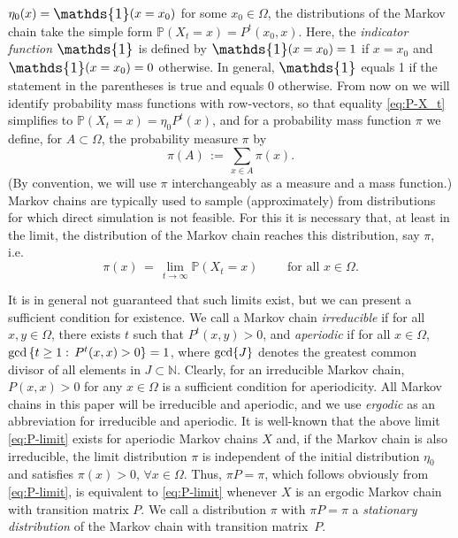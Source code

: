 \documentclass{dis}
\theoremstyle{citing}
\begin{document}
$\eta_0(x)={\scalebox{1.2}{\raisebox{-0.2mm}{$\mathds{1}$}}}(x=x_0)$ for some $x_0\in{\Omega}$, the distributions 
of the Markov chain take the simple form 
${\mathbb{P}}(X_t=x) = P^t(x_0,x)$.
Here, the 
\emph{indicator function} 
${\scalebox{1.2}{\raisebox{-0.2mm}{$\mathds{1}$}}}$ is defined 
by ${\scalebox{1.2}{\raisebox{-0.2mm}{$\mathds{1}$}}}(x=x_0)=1$ if $x=x_0$ and ${\scalebox{1.2}{\raisebox{-0.2mm}{$\mathds{1}$}}}(x=x_0)=0$ otherwise. 
In general, ${\scalebox{1.2}{\raisebox{-0.2mm}{$\mathds{1}$}}}$ equals 1 if the statement in the parentheses is true 
and equals 0 otherwise.
From now on we will identify probability mass functions with 
row-vectors, so that equality \eqref{eq:P-X_t} simplifies to 
${\mathbb{P}}(X_t=x) = \eta_0 P^t(x)$, and 
for a probability mass function $\pi$ we define, for $A\subset{\Omega}$, 
the probability measure $\pi$ by
\[
\pi(A) \,:=\, \sum_{x\in A} \pi(x).
\]
(By convention, we will use $\pi$ interchangeably as a measure and a 
mass function.) \\
Markov chains are typically used to sample 
(approximately) from distributions for which direct simulation 
is not feasible. For this it is necessary that, at least in the 
limit, the distribution of the Markov chain reaches this 
distribution, say $\pi$, i.e.
\vspace{1mm}
\begin{equation} \label{eq:P-limit}
\pi(x)\,=\,\lim_{t\to\infty} {\mathbb{P}}(X_t=x)\qquad \text{ for all } x\in{\Omega}.
\end{equation}

\noindent It is in general not guaranteed that such limits exist, but we 
can present a sufficient condition for 
existence. 
We call a Markov chain 
\emph{irreducible} 
if for 
all $x,y\in{\Omega}$, there exists $t$ such that $P^t(x,y)>0$, and 
\emph{aperiodic} 
if 
for all $x\in{\Omega}$, ${\rm gcd}\left\{t\ge1:\,P^t(x,x)>0\right\}=1$, 
where ${\rm gcd}\{J\}$ denotes the greatest common divisor of all 
elements in $J\subset{\ensuremath{\mathbb{N}}}$. 
Clearly, for an irreducible Markov chain, $P(x,x)>0$ for any 
$x\in{\Omega}$ is a sufficient condition for aperiodicity.
All Markov chains in this paper will be irreducible and aperiodic, 
and we use \emph{ergodic} 
as an abbreviation for irreducible and aperiodic. 
It is well-known that the above limit \eqref{eq:P-limit} exists for 
aperiodic Markov chains $X$ and, 
if the Markov chain is also irreducible, 
the limit distribution $\pi$ is independent of the initial 
distribution $\eta_0$ and satisfies $\pi(x)>0$, $\forall x\in{\Omega}$.
Thus, $\pi P=\pi$, which follows obviously from \eqref{eq:P-limit}, 
is equivalent to \eqref{eq:P-limit} whenever $X$ is an ergodic 
Markov chain with transition matrix $P$.
We call a distribution $\pi$ with $\pi P=\pi$ a 
\emph{stationary distribution} 
of the Markov chain with transition matrix~$P$. 
\end{document}
